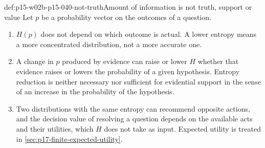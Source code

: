 \begin{hbwarning}{def:p15-w02b-p15-040-not-truth}{Amount of information is not truth, support or value}
Let \(p\) be a probability vector on the outcomes of a question.
\begin{enumerate}
\item \(H(p)\) does not depend on which outcome is actual. A lower
entropy means a more concentrated distribution, not a more accurate one.
\item A change in \(p\) produced by evidence can raise or lower \(H\)
whether that evidence raises or lowers the probability of a given
hypothesis. Entropy reduction is neither necessary nor sufficient for
evidential support in the sense of an increase in the probability of
the hypothesis.
\item Two distributions with the same entropy can recommend opposite
actions, and the decision value of resolving a question depends on the
available acts and their utilities, which \(H\) does not take as input.
Expected utility is treated in \cref{sec:p17-finite-expected-utility}.
\end{enumerate}
\end{hbwarning}


